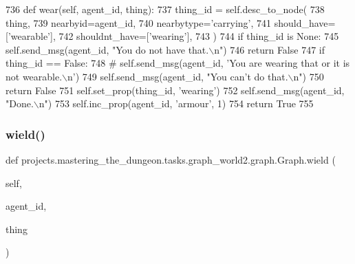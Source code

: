 \begin{DoxyCode}
736     \textcolor{keyword}{def }wear(self, agent\_id, thing):
737         thing\_id = self.desc\_to\_node(
738             thing,
739             nearbyid=agent\_id,
740             nearbytype=\textcolor{stringliteral}{'carrying'},
741             should\_have=[\textcolor{stringliteral}{'wearable'}],
742             shouldnt\_have=[\textcolor{stringliteral}{'wearing'}],
743         )
744         \textcolor{keywordflow}{if} thing\_id \textcolor{keywordflow}{is} \textcolor{keywordtype}{None}:
745             self.send\_msg(agent\_id, \textcolor{stringliteral}{"You do not have that.\(\backslash\)n"})
746             \textcolor{keywordflow}{return} \textcolor{keyword}{False}
747         \textcolor{keywordflow}{if} thing\_id == \textcolor{keyword}{False}:
748             \textcolor{comment}{# self.send\_msg(agent\_id, 'You are wearing that or it is not wearable.\(\backslash\)n')}
749             self.send\_msg(agent\_id, \textcolor{stringliteral}{"You can't do that.\(\backslash\)n"})
750             \textcolor{keywordflow}{return} \textcolor{keyword}{False}
751         self.set\_prop(thing\_id, \textcolor{stringliteral}{'wearing'})
752         self.send\_msg(agent\_id, \textcolor{stringliteral}{"Done.\(\backslash\)n"})
753         self.inc\_prop(agent\_id, \textcolor{stringliteral}{'armour'}, 1)
754         \textcolor{keywordflow}{return} \textcolor{keyword}{True}
755 
\end{DoxyCode}
\mbox{\label{classprojects_1_1mastering__the__dungeon_1_1tasks_1_1graph__world2_1_1graph_1_1Graph_aa045bba6d2db124d119b7338c5ad79f4}} 
\subsubsection{\texorpdfstring{wield()}{wield()}}
{\footnotesize\ttfamily def projects.\+mastering\+\_\+the\+\_\+dungeon.\+tasks.\+graph\+\_\+world2.\+graph.\+Graph.\+wield (\begin{DoxyParamCaption}\item[{}]{self,  }\item[{}]{agent\+\_\+id,  }\item[{}]{thing }\end{DoxyParamCaption})}



